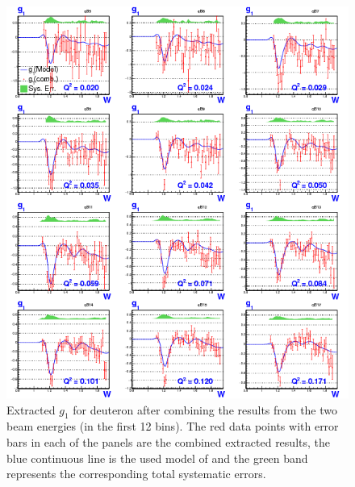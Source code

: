 \begin{figure}[H] %
  \centering
  \leavevmode \includegraphics[width=1.0\textwidth]{figuresEG4/FigResults/combinedG1_C71S181EbBothNoQeWbins70NwPd.png} 
  \caption[Combined $g_{1}$ (in first 12 \qsqs bins)]{Extracted $g_{1}$ for deuteron after combining the results from the two beam energies (in the first 12 \qsqs bins). The red data points with error bars in each of the panels are the combined extracted results, the blue continuous line is the used model of \gones and the green band represents the corresponding total systematic errors.}
  \label{extG1comb4} 
\end{figure}

